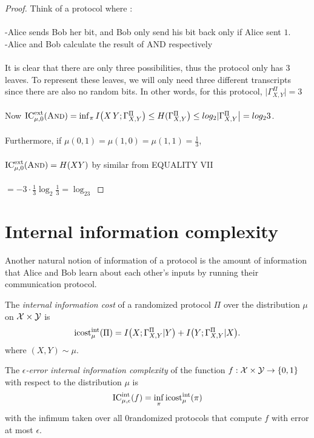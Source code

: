 \begin{proof}
	Think of a protocol where :\\
	\\
	-Alice sends Bob her bit, and Bob only send his bit back only if Alice sent $1$.\\
	-Alice and Bob calculate the result of AND respectively \\
	\\
	It is clear that there are only three possibilities, thus the protocol only has $3$ leaves. To represent these leaves, we will only need three different transcripts since there are also no random bits. In other words, for this protocol, $|\Gamma_{X,Y}^\Pi \big| = 3$ \\
	\\
	Now $\mathrm{IC}^{\mathrm{ext}}_{\mu,0}(\textsc{And}) = \inf_{\pi} I\big( X\,Y ; \Gamma_{X,Y}^\Pi \big) \le H(\Gamma_{X,Y}^\Pi \big) \le log_2|\Gamma_{X,Y}^\Pi \big| = log_23$.\\
	\\
	Furthermore, if $\mu(0,1) = \mu(1,0) = \mu(1,1) = \frac13$, \\
	\\
	$\mathrm{IC}^{\mathrm{ext}}_{\mu,0}(\textsc{And}) = H(XY)$ by similar from EQUALITY VII\\
	\\
	$= -3\cdot\frac13\log_2\frac13 = \log_23$
\end{proof}



\section{Internal information complexity}

Another natural notion of information of a protocol is the amount of information that Alice and Bob learn about each other's inputs by running their communication protocol.

\begin{definition}
	The \emph{internal information cost} of a randomized protocol $\Pi$ over the distribution $\mu$ on $\mathcal{X} \times \mathcal{Y}$ is
	\[
	\mathrm{icost}^{\mathrm{int}}_\mu(\Pi) = I\big( X ; \Gamma_{X,Y}^\Pi|Y\big) + I\big( Y ; \Gamma_{X,Y}^\Pi|X\big).
	\]
	where $(X,Y) \sim \mu$.
\end{definition}

\begin{definition}
	The \emph{$\epsilon$-error internal information complexity} of the function $f : \mathcal{X} \times \mathcal{Y} \to \{0,1\}$ with respect to the distribution $\mu$ is
	\[
	\mathrm{IC}^{\mathrm{int}}_{\mu,\epsilon}(f) = \inf_{\pi} \mathrm{icost}^{\mathrm{int}}_\mu(\pi)
	\]
	with the infimum taken over all 0randomized protocols that compute $f$ with error at most $\epsilon$.
\end{definition}

